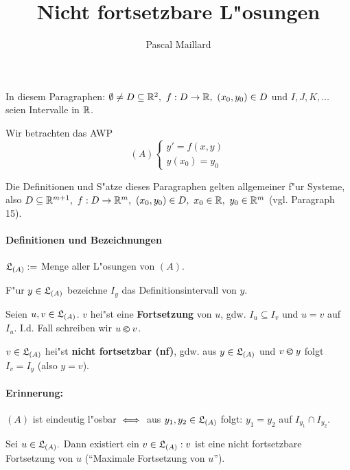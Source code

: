 \documentclass{article}
\title{Nicht fortsetzbare L"osungen}
\author{Pascal Maillard}
\begin{document}
\maketitle

In diesem Paragraphen: $\emptyset \ne D \subseteq \mathbb{R}^2,\ f:D\to\mathbb{R},\ (x_0,y_0) \in D$ und $I,J,K,\ldots$ seien Intervalle in $\mathbb{R}$.

Wir betrachten das AWP \[(A) \begin{cases} y' =f(x,y)\\ y(x_0) =y_0 \end{cases}\]

\begin{bemerkung}
Die Definitionen und S"atze dieses Paragraphen gelten allgemeiner f"ur Systeme, also $D \subseteq \MdR^{m+1},\ f:D\to\MdR^m,\ (x_0,y_0) \in D,\ x_0\in\MdR,\ y_0\in\MdR^m$ (vgl. Paragraph 15).
\end{bemerkung}

\paragraph{Definitionen und Bezeichnungen}
\begin{liste}
\item $\mathfrak{L}_{(A)} := $ Menge aller L"osungen von $(A)$.
\item F"ur $y\in\mathfrak{L}_{(A)}$ bezeichne $I_y$ das Definitionsintervall von $y$.
\item Seien $u,v \in \mathfrak{L}_{(A)}$. $v$ hei"st eine \textbf{Fortsetzung} von $u$, gdw. $I_u \subseteq I_v$ und $u=v$ auf $I_u$. I.d. Fall schreiben wir $u\varolessthan v$.
\item $v \in \mathfrak{L}_{(A)}$ hei"st \textbf{nicht fortsetzbar (nf)}, gdw. aus $y\in\mathfrak{L}_{(A)}$ und $v\varolessthan y$ folgt $I_v=I_y$ (also $y=v$).
\end{liste}

\paragraph{Erinnerung:}
$(A)$ ist eindeutig l"osbar $\iff$ aus $y_1,y_2 \in \mathfrak{L}_{(A)}$ folgt: $y_1 = y_2$ auf $I_{y_1} \cap I_{y_2}$.

\begin{satz} %
Sei $u \in \mathfrak{L}_{(A)}.$ Dann existiert ein $v \in \mathfrak{L}_{(A)}: v$ ist eine nicht fortsetzbare Fortsetzung von $u$ ("`Maximale Fortsetzung von $u$"').
\end{satz}
\end{document}
